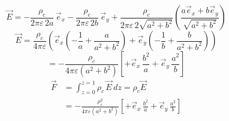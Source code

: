 \documentclass[11pt,a4paper]{article}
\begin{document}
\begin{center}
\end{center}

\[ \vec E=-\frac{\rho_c}{2\pi\varepsilon\,2a}\,\vec e_x-\frac{\rho_c}{2\pi\varepsilon\,2b}\,\vec e_y+\frac{\rho_c}{2\pi\varepsilon\,2\sqrt{a^2+b^2}}\left(\frac{a\vec e_x+b\vec e_y}{\sqrt{a^2+b^2}}\right) \]
\[ \vec E=\frac{\rho_c}{4\pi\varepsilon}\left(\vec e_x\left(-\frac{1}{a}+\frac{a}{a^2+b^2}\right)+\vec e_y\left(-\frac{1}{b}+\frac{b}{a^2+b^2}\right)\right) \]
\[ =-\frac{\rho_c}{4\pi\varepsilon(a^2+b^2)}\left[+\vec e_x\,\frac{b^2}{a}+\vec e_y\,\frac{a^2}{b}\right] \]
\begin{align*}
\vec F &= \int_{z=0}^{z=1}\rho_c\,\vec E\,dz=\rho_c\vec E \\
&= -\frac{\rho_c^2}{4\pi\varepsilon(a^2+b^2)}\left[+\vec e_x\,\frac{b^2}{a}+\vec e_y\,\frac{a^2}{b}\right]
\end{align*}
\end{document}

